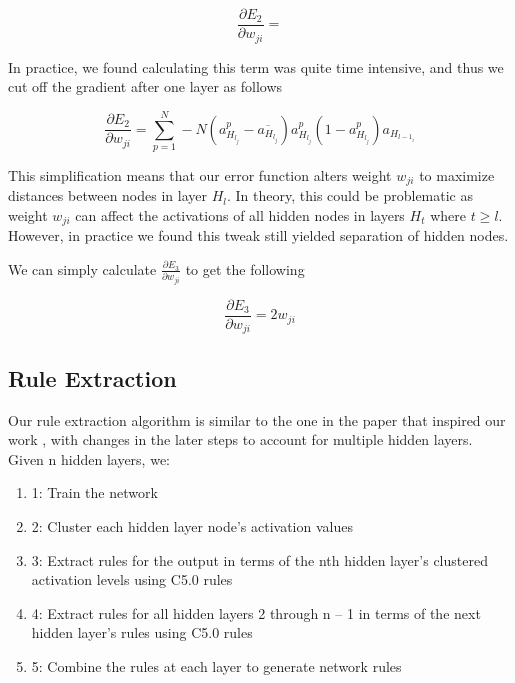 \begin{equation}
  \frac{\partial E_2}{\partial w_{ji}} = 
\end{equation}

In practice, we found calculating this term was quite time intensive, and thus
we cut off the gradient after one layer as follows

\begin{equation}
  \frac{\partial E_2}{\partial w_{ji}} = \sum_{p=1}^{N} -N(a_{H_{l_j}}^p - \overline{a_{H_{l_j}}})a_{H_{l_j}}^p(1-a_{H_{l_j}}^p)a_{H_{l-1_i}}
\end{equation}

This simplification means that our error function alters weight
$w_{ji}$ to maximize distances between nodes in layer $H_{l}$. In theory, this
could be problematic as weight $w_{ji}$ can affect the activations of all
hidden nodes in layers $H_{t}$ where $t \geq l$. However, in practice we
found this tweak still yielded separation of hidden nodes.

We can simply calculate $\frac{\partial E_3}{\partial w_{ji}}$ to get the following

\begin{equation}
  \frac{\partial E_3}{\partial w_{ji}} = 2 w_{ji}
\end{equation}

\subsection{Rule Extraction}
\label{sec:re}

Our rule extraction algorithm is similar to the one in the paper that inspired our work \cite{thuan11}, with changes in the later steps to account for multiple hidden layers. Given n hidden layers, we:
\begin{enumerate}
\item
1: Train the network
\item
2: Cluster each hidden layer node’s activation values 
\item
3: Extract rules for the output in terms of the nth hidden layer’s clustered activation levels using C5.0 rules
\item
4: Extract rules for all hidden layers 2 through n – 1 in terms of the next hidden layer’s rules using C5.0 rules
\item
5: Combine the rules at each layer to generate network rules
\end{enumerate}


